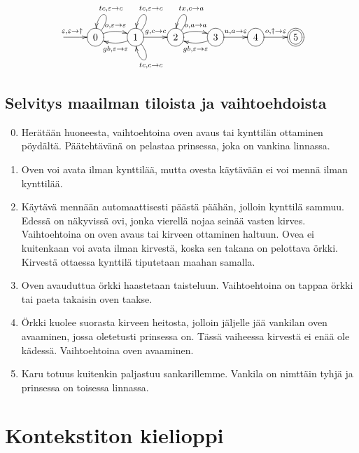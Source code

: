 \documentclass[a4paper,12pt,finnish]{article}
\begin{document}
 \[
  \xymatrix{
    \ar@/l6pt/[r]^{\varepsilon,\varepsilon \to \dagger} &
    *++[o][F]{0} \ar@(ur,u)_{tc,\varepsilon \to c} \ar@/u6pt/[r]^{o,\varepsilon \to \varepsilon} &
    *++[o][F]{1} \ar[r]^{g,c \to c} \ar@(ur,u)_{tc,\varepsilon\to c} \ar@(dr,d)^{tc,c\to c} \ar @/d6pt/[l]^{gb, \varepsilon \to \varepsilon} &
    *++[o][F]{2} \ar@(ur,u)_{tx,c\to a}  \ar@/u6pt/[r]^{o, a \to a} &
    *++[o][F]{3} \ar@/d6pt/[l]^{gb, \varepsilon \to \varepsilon} \ar[r]^{u, a \to \varepsilon} &
    *++[o][F]{4} \ar[r]^{o, \dagger \to \varepsilon} &
    *++[o][F=]{5} 
  }
  \]

\subsection {Selvitys maailman tiloista ja vaihtoehdoista}

\begin{enumerate}
\setcounter{enumi}{-1}
\item  Herätään huoneesta, vaihtoehtoina oven avaus tai kynttilän ottaminen pöydältä. Päätehtävänä on pelastaa prinsessa, 
joka on vankina linnassa.
\item Oven voi avata ilman kynttilää, mutta ovesta käytävään ei voi mennä ilman kynttilää.
\item  Käytävä mennään automaattisesti päästä päähän, jolloin kynttilä sammuu. Edessä on näkyvissä ovi, jonka vierellä nojaa seinää vasten kirves.
Vaihtoehtoina on oven avaus tai kirveen ottaminen haltuun. Ovea ei kuitenkaan voi avata ilman kirvestä, koska sen takana on pelottava örkki.
 Kirvestä ottaessa kynttilä tiputetaan maahan samalla. 
\item  Oven avauduttua örkki haastetaan taisteluun. Vaihtoehtoina on tappaa örkki tai paeta takaisin oven taakse.
\item Örkki kuolee suorasta kirveen heitosta, jolloin jäljelle jää vankilan oven avaaminen, jossa oletetusti prinsessa on. Tässä
vaiheessa kirvestä ei enää ole kädessä. Vaihtoehtoina oven avaaminen.
\item Karu totuus kuitenkin paljastuu sankarillemme. Vankila on nimttäin tyhjä ja prinsessa on toisessa linnassa.
\end {enumerate}

\section {Kontekstiton kielioppi}
\end{document}
